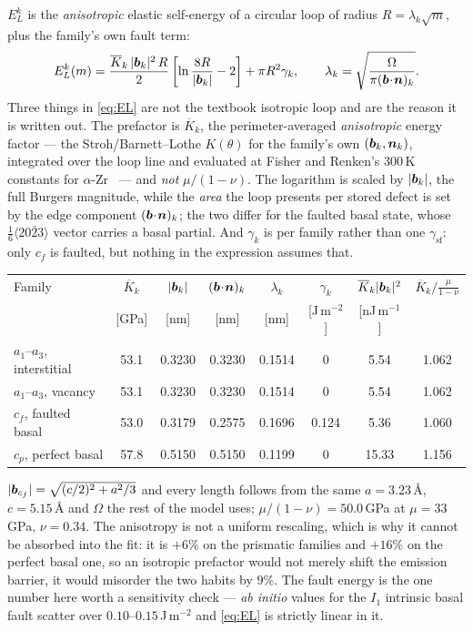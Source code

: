 $E_L^{k}$ is the \emph{anisotropic} elastic self-energy of a circular loop of
radius $R=\lambda_k\sqrt m$, plus the family's own fault term:
\begin{equation}
  E_L^{k}(m)=\frac{\overline K_k\,|\bm{b}_k|^{2}\,R}{2}
         \left[\ln\frac{8R}{|\bm{b}_k|}-2\right]
       + \pi R^{2}\gamma_k ,
  \qquad
  \lambda_k=\sqrt{\frac{\Omega}{\pi(\bm{b}\!\cdot\!\bm{n})_k}} .
  \label{eq:EL}
\end{equation}
Three things in \cref{eq:EL} are not the textbook isotropic loop and are the
reason it is written out. The prefactor is $\overline K_k$, the
perimeter-averaged \emph{anisotropic} energy factor --- the Stroh/Barnett--Lothe
$K(\theta)$ for the family's own $(\bm{b}_k,\bm{n}_k)$, integrated over the loop
line and evaluated at Fisher and Renken's $300\,$K constants for
$\alpha$-Zr~\citep{fisher1964single} --- and \emph{not} $\mu/(1-\nu)$. The
logarithm is scaled by $|\bm{b}_k|$, the full Burgers magnitude, while the
\emph{area} the loop presents per stored defect is set by the edge component
$(\bm{b}\!\cdot\!\bm{n})_k$; the two differ for the faulted basal state, whose
$\tfrac16\langle20\bar23\rangle$ vector carries a basal partial. And $\gamma_k$
is per family rather than one $\gamma_{\mathrm{sf}}$: only $c_f$ is faulted, but
nothing in the expression assumes that.

\begin{center}\small
\begin{tabular}{@{}lccccccc@{}}
\toprule
Family & $\overline K_k$ & $|\bm{b}_k|$ & $(\bm{b}\!\cdot\!\bm{n})_k$
       & $\lambda_k$ & $\gamma_k$ & $\overline K_k|\bm{b}_k|^{2}$
       & $\overline K_k\big/\tfrac{\mu}{1-\nu}$ \\
       & [GPa] & [nm] & [nm] & [nm] & [J\,m$^{-2}$] & [nJ\,m$^{-1}$] & \\
\midrule
$a_1$--$a_3$, interstitial & 53.1 & 0.3230 & 0.3230 & 0.1514 & 0     & 5.54  & 1.062 \\
$a_1$--$a_3$, vacancy      & 53.1 & 0.3230 & 0.3230 & 0.1514 & 0     & 5.54  & 1.062 \\
$c_f$, faulted basal       & 53.0 & 0.3179 & 0.2575 & 0.1696 & 0.124 & 5.36  & 1.060 \\
$c_p$, perfect basal       & 57.8 & 0.5150 & 0.5150 & 0.1199 & 0     & 15.33 & 1.156 \\
\bottomrule
\end{tabular}
\end{center}

\noindent
$|\bm{b}_{c_f}|=\sqrt{(c/2)^{2}+a^{2}/3}$ and every length follows from the same
$a=3.23\,$\AA, $c=5.15\,$\AA{} and $\Omega$ the rest of the model uses;
$\mu/(1-\nu)=50.0\,$GPa at $\mu=33\,$GPa, $\nu=0.34$. The anisotropy is not a
uniform rescaling, which is why it cannot be absorbed into the fit: it is
$+6\%$ on the prismatic families and $+16\%$ on the perfect basal one, so an
isotropic prefactor would not merely shift the emission barrier, it would
misorder the two habits by $9\%$. The fault energy is the one number here worth
a sensitivity check --- \emph{ab initio} values for the $I_1$ intrinsic basal
fault scatter over $0.10$--$0.15\,$J\,m$^{-2}$ and \cref{eq:EL} is strictly
linear in it.

